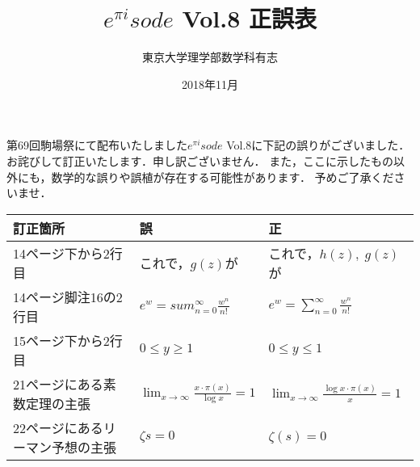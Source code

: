 \documentclass{jsarticle}
\title{$e^{\pi i}sode$ Vol.8 正誤表}
\date{2018年11月}
\author{東京大学理学部数学科有志}
\begin{document}
\maketitle

第69回駒場祭にて配布いたしました$e^{\pi i}sode$ Vol.8に下記の誤りがございました．
お詫びして訂正いたします．申し訳ございません．
また，ここに示したもの以外にも，数学的な誤りや誤植が存在する可能性があります．
予めご了承くださいませ．

\begin{table}[h]
\begin{center}
\begin{tabular}{lll}
訂正箇所&誤&正 \\\hline
14ページ下から2行目&これで，$g(z)$が&これで，$h(z),\;g(z)$が \\
14ページ脚注16の2行目&$e^w=sum^\infty_{n=0}\frac{w^n}{n!}$&$e^w=\sum^\infty_{n=0}\frac{w^n}{n!}$ \\
15ページ下から2行目&$0\leq y\geq 1$&$0\leq y\leq 1$ \\
21ページにある素数定理の主張&$\displaystyle\lim_{x\to\infty}\frac{x\cdot\pi(x)}{\log x}=1$&$\displaystyle\lim_{x\to\infty}\frac{\log x\cdot\pi(x)}{x}=1$ \\
22ページにあるリーマン予想の主張&$\zeta{s}=0$&$\zeta(s)=0$
\end{tabular}
\end{center}
\end{table}
\end{document}
